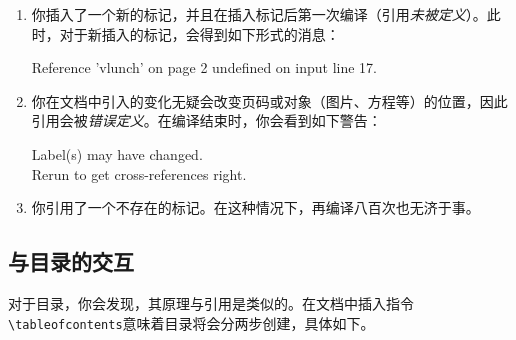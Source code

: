 \begin{enumerate}
  \item 你插入了一个新的标记，并且在插入标记后第一次编译（引用\emph{未被定义}）。此时，对于新插入的标记，会得到如下形式的消息：
  
  \begin{dmd}
  Reference 'vlunch' on page 2 undefined on input line 17.
  \end{dmd}

  \item 你在文档中引入的变化无疑会改变页码或对象（图片、方程等）的位置，因此引用会被\emph{错误定义}。在编译结束时，你会看到如下警告：
  
  \begin{dmd}
  Label(s) may have changed.\\
  Rerun to get cross-references right.
  \end{dmd}

  \item 你引用了一个不存在的标记。在这种情况下，再编译八百次也无济于事。
\end{enumerate}

\subsection{与目录的交互}

对于目录，你会发现，其原理与引用是类似的。在文档中插入指令\verb|\tableofcontents|意味着目录将会分两步创建，具体如下。

